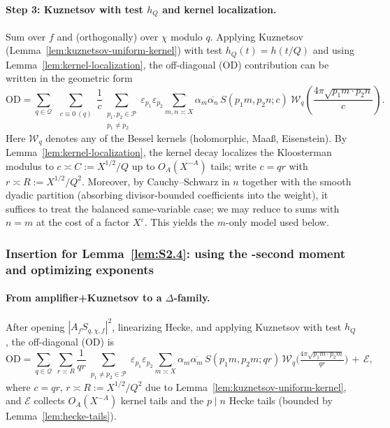\documentclass[11pt]{article}
\theoremstyle{definition}
\theoremstyle{remark}
\numberwithin{equation}{part}
\begin{document}
\paragraph{Step 3: Kuznetsov with test $h_Q$ and kernel localization.}
Sum over $f$ and (orthogonally) over $\chi$ modulo $q$.
Applying Kuznetsov (Lemma~\ref{lem:kuznetsov-uniform-kernel}) with test $h_Q(t)=h(t/Q)$ and using Lemma~\ref{lem:kernel-localization},
the off-diagonal (OD) contribution can be written in the geometric form
\[
	\mathrm{OD}
	=\sum_{q\in\mathcal Q}\ \sum_{\substack{c\equiv 0\ (q)}} \frac{1}{c}
	\sum_{\substack{p_1,p_2\in\mathcal P\\ p_1\ne p_2}}\varepsilon_{p_1}\varepsilon_{p_2}
	\sum_{m,n\asymp X}\alpha_m\overline{\alpha_n}\,
	S(p_1 m, p_2 n;c)\ \mathcal W_q\!\left(\frac{4\pi\sqrt{p_1 m\cdot p_2 n}}{c}\right).
\]
Here $\mathcal W_q$ denotes any of the Bessel kernels (holomorphic, Maa\ss, Eisenstein).
By Lemma~\ref{lem:kernel-localization}, the kernel decay localizes the Kloosterman modulus to
$c\asymp C:=X^{1/2}/Q$ up to $O_A(X^{-A})$ tails; write $c=qr$ with $r\asymp R:=X^{1/2}/Q^2$.
Moreover, by Cauchy--Schwarz in $n$ together with the smooth dyadic partition (absorbing divisor-bounded coefficients into the weight), it suffices to treat the balanced same-variable case; we may reduce to sums with $n=m$ at the cost of a factor $X^{\varepsilon}$. This yields the $m$-only model used below.

\subsubsection{Insertion for Lemma~\ref{lem:S2.4}: using the \textDelta-second moment and optimizing exponents}

\paragraph{From amplifier+Kuznetsov to a $\Delta$-family.}
After opening $|A_f S_{q,\chi,f}|^2$, linearizing Hecke, and applying Kuznetsov with test $h_Q$, the off-diagonal (OD) is
\[
	\mathrm{OD}
	=\sum_{q\in\mathcal Q}\ \sum_{r\asymp R}\frac{1}{qr}
	\!\!\sum_{\substack{p_1\ne p_2\in\mathcal P}}\!\!\varepsilon_{p_1}\varepsilon_{p_2}\!
	\sum_{m\asymp X}\alpha_m\overline{\alpha_{m}}\,
	S(p_1m,p_2m;qr)\,\mathcal W_{q}\!\Big(\tfrac{4\pi\sqrt{p_1m\cdot p_2m}}{qr}\Big)\,+\,\mathcal E,
\]
where $c=qr$, $r\asymp R:=X^{1/2}/Q^{2}$ due to Lemma~\ref{lem:kuznetsov-uniform-kernel},
and $\mathcal E$ collects $O_A(X^{-A})$ kernel tails and the $p\mid n$ Hecke tails
(bounded by Lemma~\ref{lem:hecke-tails}).
\end{document}
